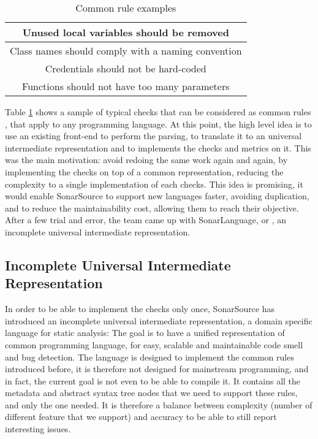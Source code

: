 \begin{table}[h]
\centering
\caption{Common rule examples}
\label{table:common_rules}
	\begin{tabular}{|c|}
		\hline
		Unused local variables should be removed  \\ \hline
		Class names should comply with a naming convention \\ \hline
		Credentials should not be hard-coded \\ \hline
		Functions should not have too many parameters \\ \hline
	\end{tabular}
\end{table}

Table \ref{table:common_rules} shows a sample of typical checks that can be considered as common rules \cite{JiraSonarSource:2019:Online}, that apply to any programming language.
At this point, the high level idea is to use an existing front-end to perform the parsing, to translate it to an universal intermediate representation and to implements the checks and metrics on it.
This was the main motivation: avoid redoing the same work again and again, by implementing the checks on top of a common representation, reducing the complexity to a single implementation of each checks.
This idea is promising, it would enable SonarSource to support new languages faster, avoiding duplication, and to reduce the maintainability cost, allowing them to reach their objective.
After a few trial and error, the team came up with SonarLanguage, or \slang{}, an incomplete universal intermediate representation. 


\subsection{Incomplete Universal Intermediate Representation}
\label{subsec:slang}

In order to be able to implement the checks only once, SonarSource has introduced an incomplete universal intermediate representation, a domain specific language for static analysis: \textbf{\slang{}}
The goal is to have a unified representation of common programming language, for easy, scalable and maintainable code smell and bug detection. 
The language is designed to implement the common rules introduced before, it is therefore not designed for mainstream programming, and in fact, the current goal is not even to be able to compile it.
It contains all the metadata and abstract syntax tree nodes that we need to support these rules, and only the one needed.
It is therefore a balance between complexity (number of different feature that we support) and accuracy to be able to still report interesting issues. 

